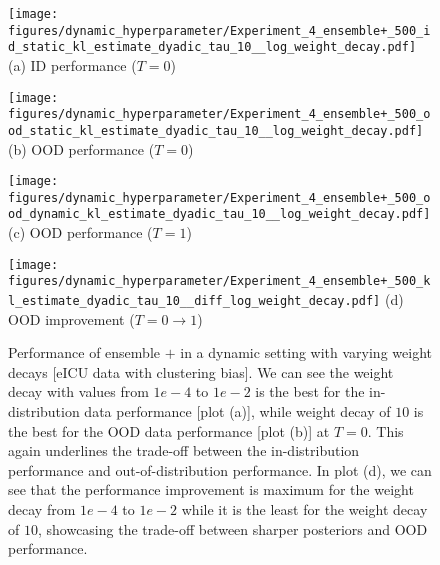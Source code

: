 \begin{figure}[h]
\centering
\begin{minipage}[b]{0.24\textwidth}
\centering
\texttt{[image: figures/dynamic\_hyperparameter/Experiment\_4\_ensemble+\_500\_id\_static\_kl\_estimate\_dyadic\_tau\_10\_\_log\_weight\_decay.pdf]}
{\small{{(a)} ID performance ($T=0 $) }}
\end{minipage}
\hfill
\begin{minipage}[b]{0.24\textwidth}
\centering \texttt{[image: figures/dynamic\_hyperparameter/Experiment\_4\_ensemble+\_500\_ood\_static\_kl\_estimate\_dyadic\_tau\_10\_\_log\_weight\_decay.pdf]}
{\small{{(b)} OOD performance ($T=0$) }}
\end{minipage}
\hfill
\begin{minipage}[b]{0.24\textwidth}
\centering \texttt{[image: figures/dynamic\_hyperparameter/Experiment\_4\_ensemble+\_500\_ood\_dynamic\_kl\_estimate\_dyadic\_tau\_10\_\_log\_weight\_decay.pdf]}
{\small{{(c)} OOD performance ($T=1$) }}
\end{minipage}
\hfill
\begin{minipage}[b]{0.24\textwidth}
\centering \texttt{[image: figures/dynamic\_hyperparameter/Experiment\_4\_ensemble+\_500\_kl\_estimate\_dyadic\_tau\_10\_\_diff\_log\_weight\_decay.pdf]}
{\small{{(d)} OOD improvement ($T=0 \to 1$) }}
\end{minipage}
\caption{Performance of ensemble $+$ in a dynamic setting with varying weight decays [eICU data with clustering bias].
We can see the weight decay with values from $1e-4$ to $1e-2$ is the  best for the in-distribution data performance [plot (a)], while weight decay of $10$ is the best for the OOD data performance [plot (b)] at $T=0$. 
This again underlines the trade-off between the in-distribution performance and out-of-distribution performance. In plot (d), we can see that the performance improvement is maximum for the weight decay from $1e-4$ to $1e-2$ while it is the least for the weight decay of $10$, showcasing the trade-off between sharper posteriors and OOD performance. 
}
\label{fig:Ensemble+_weight_decay}
\end{figure}







